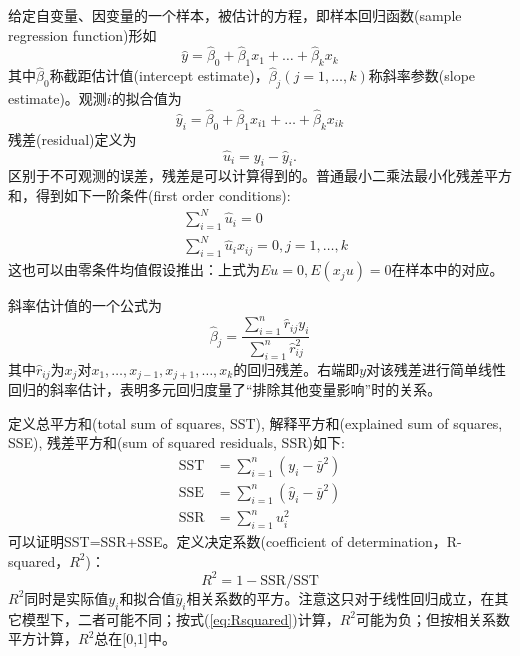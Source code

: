 \par 给定自变量、因变量的一个样本，被估计的方程，即样本回归函数(sample regression function)形如
\begin{equation}
    \hat{y}=\hat{\beta}_0+\hat{\beta}_1 x_1+\dots+\hat{\beta}_k x_k
\end{equation}
其中$\hat{\beta}_0$称截距估计值(intercept estimate)，$\hat{\beta}_j(j=1,\dots,k)$称斜率参数(slope estimate)。观测$i$的拟合值为
\begin{equation}
    \hat{y}_i=\hat{\beta}_0+\hat{\beta}_1 x_{i1}+\dots+\hat{\beta}_k x_{ik}
\end{equation}
残差(residual)定义为
\begin{equation}
    \hat{u}_i = y_i-\hat{y}_i.
\end{equation}
区别于不可观测的误差，残差是可以计算得到的。普通最小二乘法最小化残差平方和，得到如下一阶条件(first order conditions):
\begin{align}
    &\sum_{i=1}^N \hat{u}_i=0\\
    &\sum_{i=1}^N \hat{u}_ix_{ij}=0, j=1,\dots,k
\end{align}
这也可以由零条件均值假设推出：上式为$Eu=0, E(x_ju)=0$在样本中的对应。

\par 斜率估计值的一个公式为
\begin{equation}
    \hat{\beta}_j=\frac{\sum_{i=1}^n \hat{r}_{ij}y_i}{\sum_{i=1}^n \hat{r}_{ij}^2}
\end{equation}
其中$\hat{r}_{ij}$为$x_j$对$x_1,\dots,x_{j-1},x_{j+1},\dots,x_k$的回归残差。右端即$y$对该残差进行简单线性回归的斜率估计，表明多元回归度量了“排除其他变量影响”时的关系。

\par 定义总平方和(total sum of squares, SST), 解释平方和(explained sum of squares, SSE), 残差平方和(sum of squared residuals, SSR)如下:
\begin{align}
    \text{SST}&=\sum_{i=1}^n (y_i-\bar{y}^2)\\
    \text{SSE}&=\sum_{i=1}^n (\hat{y}_i-\bar{y}^2)\\
    \text{SSR}&=\sum_{i=1}^n u_i^2
\end{align}
可以证明SST=SSR+SSE。定义决定系数(coefficient of determination，R-squared，$R^2$)：
\begin{equation}
    R^2=1-\text{SSR}/\text{SST}\label{eq:Rsquared}
\end{equation}
$R^2$同时是实际值$y_i$和拟合值$\hat{y}_i$相关系数的平方。注意这只对于线性回归成立，在其它模型下，二者可能不同；按式(\ref{eq:Rsquared})计算，$R^2$可能为负；但按相关系数平方计算，$R^2$总在[0,1]中。

